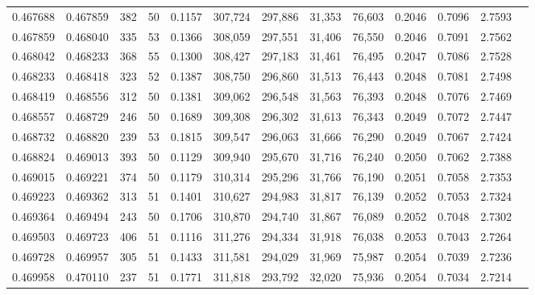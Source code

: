 \begin{tabular}{rrrrrrrrrrrrr}
0.467688 & 0.467859 &   382 &  50 &                                     0.1157 & 307,724 & 297,886 &  31,353 &  76,603 & 0.2046 & 0.7096 & 2.7593 \\
0.467859 & 0.468040 &   335 &  53 &                                     0.1366 & 308,059 & 297,551 &  31,406 &  76,550 & 0.2046 & 0.7091 & 2.7562 \\
0.468042 & 0.468233 &   368 &  55 &                                     0.1300 & 308,427 & 297,183 &  31,461 &  76,495 & 0.2047 & 0.7086 & 2.7528 \\
0.468233 & 0.468418 &   323 &  52 &                                     0.1387 & 308,750 & 296,860 &  31,513 &  76,443 & 0.2048 & 0.7081 & 2.7498 \\
0.468419 & 0.468556 &   312 &  50 &                                     0.1381 & 309,062 & 296,548 &  31,563 &  76,393 & 0.2048 & 0.7076 & 2.7469 \\
0.468557 & 0.468729 &   246 &  50 &                                     0.1689 & 309,308 & 296,302 &  31,613 &  76,343 & 0.2049 & 0.7072 & 2.7447 \\
0.468732 & 0.468820 &   239 &  53 &                                     0.1815 & 309,547 & 296,063 &  31,666 &  76,290 & 0.2049 & 0.7067 & 2.7424 \\
0.468824 & 0.469013 &   393 &  50 &                                     0.1129 & 309,940 & 295,670 &  31,716 &  76,240 & 0.2050 & 0.7062 & 2.7388 \\
0.469015 & 0.469221 &   374 &  50 &                                     0.1179 & 310,314 & 295,296 &  31,766 &  76,190 & 0.2051 & 0.7058 & 2.7353 \\
0.469223 & 0.469362 &   313 &  51 &                                     0.1401 & 310,627 & 294,983 &  31,817 &  76,139 & 0.2052 & 0.7053 & 2.7324 \\
0.469364 & 0.469494 &   243 &  50 &                                     0.1706 & 310,870 & 294,740 &  31,867 &  76,089 & 0.2052 & 0.7048 & 2.7302 \\
0.469503 & 0.469723 &   406 &  51 &                                     0.1116 & 311,276 & 294,334 &  31,918 &  76,038 & 0.2053 & 0.7043 & 2.7264 \\
0.469728 & 0.469957 &   305 &  51 &                                     0.1433 & 311,581 & 294,029 &  31,969 &  75,987 & 0.2054 & 0.7039 & 2.7236 \\
0.469958 & 0.470110 &   237 &  51 &                                     0.1771 & 311,818 & 293,792 &  32,020 &  75,936 & 0.2054 & 0.7034 & 2.7214 \\

\end{tabular}
